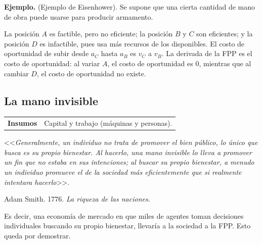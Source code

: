 \documentclass{report}
\newenvironment{example}[1]{\noindent\setlength{\parskip}{0pt}\textbf{Ejemplo.} (#1).}{}
\newenvironment{definition}[1]{\begin{center}
\begin{tabular}{p{3.5cm} p{12.5cm}}
\textbf{#1} &
}
{\\ \end{tabular}\end{center}}
\begin{document}
\begin{example}{Ejemplo de Eisenhower}
Se supone que una cierta cantidad de mano de obra puede usarse para producir armamento.
\begin{center}
\end{center}
\end{example}

La posición $A$ es factible, pero no eficiente; la posición $B$ y $C$ son eficientes; y la posición $D$ es infactible, pues usa más recursos de los disponibles. El costo de oportunidad de subir desde $a_C$ hasta $a_B$ es $v_C$ a $v_B$. La derivada de la FPP es el costo de oportunidad: al variar $A$, el costo de oportunidad es $0$, mientras que al cambiar $D$, el costo de oportunidad no existe.

\subsection{La mano invisible}

\begin{definition}{Insumos}
Capital y trabajo (máquinas y personas).
\end{definition}

\begin{center}
<<\textit{Generalmente, un individuo no trata de promover el bien público, lo único que busca es su propio bienestar. Al hacerlo, una mano invisible lo lleva a promover un fin que no estaba en sus intenciones; al buscar su propio bienestar, a menudo un individuo promueve el de la sociedad más eficientemente que si realmente intentara hacerlo}>>.
\end{center}
\begin{flushright}
Adam Smith. 1776. \textit{La riqueza de las naciones}.
\end{flushright}

Es decir, una economía de mercado en que miles de agentes toman decisiones individuales buscando su propio bienestar, llevaría a la sociedad a la FPP. Esto queda por demostrar.
\end{document}
